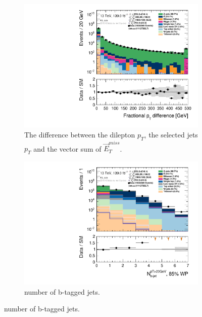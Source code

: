 \begin{figure}[H]
\begin{subfigure}[t!]{0.49\textwidth}
        \includegraphics[width=\textwidth]{Figures/ML_cuts/hist1d_pTdiff_ML_cuts.pdf}
    \caption{The difference between the dilepton $p_T$, the selected jets $p_T$ and the vector sum of $\Vec{E}_T^{miss}$.}
    \label{fig:my_label}
    \end{subfigure}
    \begin{subfigure}[t!]{0.49\textwidth}
        \includegraphics[width=\textwidth]{Figures/ML_cuts/hist1d_nBJet20_MV2c10_FixedCutBEff_85_ML_cuts.pdf}
    \caption{number of b-tagged jets.}
    \label{fig:bjetMLcuts}
    \end{subfigure}
\end{figure}


